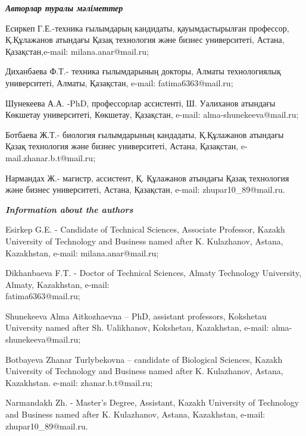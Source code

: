 \begin{authorinfo}
\emph{{\bfseries Авторлар туралы мәліметтер}}

Есиркеп Г.Е.-техника ғылымдарың кандидаты, қауымдастырылған профессор,
Қ.Құлажанов атындағы Қазақ технология және бизнес университеті, Астана,
Қазақстан,e-mail: milana.anar@mail.ru;

Диханбаева Ф.Т.- техника ғылымдарының докторы, Алматы технологиялық
университеті, Алматы, Қазақстан, e-mail: fatima6363@mail.ru;

Шунекеева А.А. -PhD, профессорлар ассистенті, Ш. Уалиханов атындағы
Көкшетау университеті, Көкшетау, Қазақстан, e-mail:
alma-shunekeeva@mail.ru;

Ботбаева Ж.Т.- биология ғылымдарының кандадаты, Қ.Құлажанов атындағы
Қазақ технология және бизнес университеті, Астана, Қазақстан,
e-mail.zhanar.b.t@mail.ru;

Нармандах Ж.- магистр, ассистент, Қ. Құлажанов атындағы Қазақ технология
және бизнес университеті, Астана, Қазақстан, e-mail:
zhupar10\_89@mail.ru.

\emph{{\bfseries Information about the authors}}

Esirkep G.E. - Candidate of Technical Sciences, Associate Professor,
Kazakh University of Technology and Business named after K. Kulazhanov,
Astana, Kazakhstan, e-mail: milana.anar@mail.ru;

Dikhanbaeva F.T. - Doctor of Technical Sciences, Almaty Technology
University, Almaty, Kazakhstan, e-mail: \\fatima6363@mail.ru;

Shunekeeva Alma Aitkozhaevna -- PhD, assistant professors, Kokshetau
University named after Sh. Ualikhanov, Kokshetau, Kazakhstan, e-mail:
alma-shunekeeva@mail.ru;

Botbayeva Zhanar Turlybekovna -- candidate of Biological Sciences,
Kazakh University of Technology and Business named after K. Kulazhanov,
Astana, Kazakhstan. e-mail: zhanar.b.t@mail.ru;

Narmandakh Zh. - Master's Degree, Assistant, Kazakh University of
Technology and Business named after K. Kulazhanov, Astana, Kazakhstan,
e-mail: zhupar10\_89@mail.ru.
\end{authorinfo}
